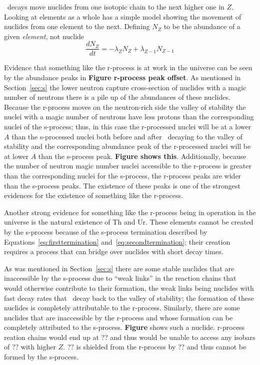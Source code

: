 
\bminus\ decays move nuclides from one isotopic chain to the next
higher one in $Z$.  Looking at elements as a whole \cite{iliadis2008}
has a simple model showing the movement of nuclides from one element
to the next.  Defining $N_Z$ to be the abundance of a given {\it
element}, not nuclide
\begin{equation}
\frac{dN_Z}{dt} = - \lambda_ZN_Z + \lambda_{Z-1}N_{Z-1}
\end{equation}

 Evidence that
something like the r-process is at work in the universe can be seen by
the abundance peaks in {\bf Figure r-process peak offset}.  As
mentioned in Section~\ref{sec:s} 
the lower neutron capture cross-section of nuclides with a magic
number of neutrons there is a pile up of the abundances of these
nuclides.   Because the r-process moves on the neutron-rich side
the valley of stability the nuclei with a magic number of neutrons
have less protons than the corresponding nuclei of the s-process;
thus, in this case the r-processed nuclei will be at a lower $A$ than the
s-processed nuclei both before and after \bminus\ decaying to the
valley of stability and the corresponding abundance peak of the
r-processed nuclei will be at lower $A$ than the s-process peak.  {\bf
Figure shows this}.  Additionally, because the number of neutron magic
number nuclei accessible to the r-process is greater than the
corresponding nuclei for the s-process, the r-process peaks are wider
than the s-process peaks.  The existence of these peaks is one of the
strongest evidences for the existence of something like the r-process.

Another strong evidence for something like the r-process being in
operation in the universe is the natural existence of Th and Ur.
These elements cannot be created by the s-process because of the
s-process termination described by Equations~\ref{eq:firsttermination}
and~\ref{eq:secondtermination}; their creation requires a process that
can bridge over nuclides with short decay times.

As was mentioned in Section~\ref{sec:s} there are some stable nuclides
that are inaccessible by the s-process due to ``weak links'' in the
reaction chains that would otherwise contribute to their formation,
the weak links being nuclides with fast decay rates that \bminus\
decay back to the valley of stability; the formation of these nuclides
is completely attributable to the r-process.  Similarly, there are
some nuclides that are inaccessible by the r-process and whose
formation can be completely attributed to the s-process.  {\bf Figure}
shows such a nuclide.  r-process reation chains would end up at ?? and
thus would be unable to access any isobars of ?? with higher $Z$.  ??
is shielded from the r-process by ?? and thus cannot be formed by the
s-process.



